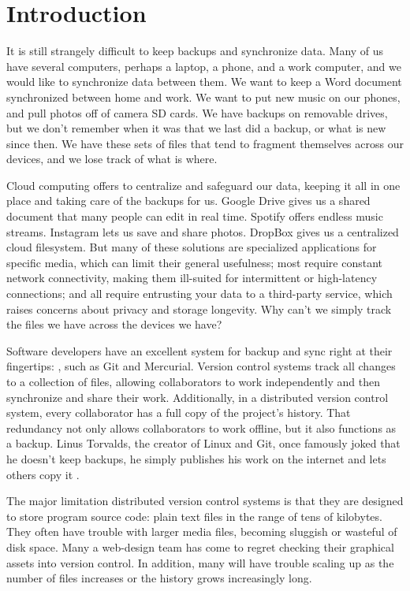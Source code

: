 \chapter{Introduction}

It is still strangely difficult to keep backups and synchronize data. Many of us
have several computers, perhaps a laptop, a phone, and a work computer, and we
would like to synchronize data between them. We want to keep a Word document
synchronized between home and work. We want to put new music on our phones, and
pull photos off of camera SD cards. We have backups on removable drives, but we
don't remember when it was that we last did a backup, or what is new since then.
We have these sets of files that tend to fragment themselves across our devices,
and we lose track of what is where.

Cloud computing offers to centralize and safeguard our data, keeping it all in
one place and taking care of the backups for us. Google Drive gives us a shared
document that many people can edit in real time. Spotify offers endless music
streams. Instagram lets us save and share photos. DropBox gives us a centralized
cloud filesystem. But many of these solutions are specialized applications for
specific media, which can limit their general usefulness; most require constant
network connectivity, making them ill-suited for intermittent or high-latency
connections; and all require entrusting your data to a third-party service,
which raises concerns about privacy and storage longevity. Why can't we simply
track the files we have across the devices we have?

Software developers have an excellent system for backup and sync right at their
fingertips: , such as Git
and Mercurial. Version control systems track all changes to a collection of
files, allowing collaborators to work independently and then synchronize and
share their work. Additionally, in a distributed version control system, every
collaborator has a full copy of the project's history. That redundancy not only
allows collaborators to work offline, but it also functions as a backup. Linus
Torvalds, the creator of Linux and Git, once famously joked that he doesn't keep
backups, he simply publishes his work on the internet and lets others copy it
\cite{linus_no_backups}.

The major limitation distributed version control systems is that they are
designed to store program source code: plain text files in the range of tens of
kilobytes. They often have trouble with larger media files, becoming sluggish or
wasteful of disk space. Many a web-design team has come to regret checking their
graphical assets into version control. In addition, many will have trouble
scaling up as the number of files increases or the history grows increasingly
long.

